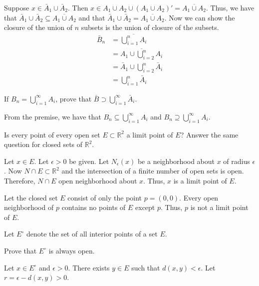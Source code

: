 \begin{exercise}
\begin{exercise}[label = (\alph*), ref = \arabic{exercisei} (\alph*)]
    Suppose \(x\in\bar{A}_1\cup \bar{A}_2\).
    Then \(x\in A_1\cup A_2\cup (A_1\cup A_2)' = \overline{A_1\cup A_2}\).
    Thus, we have that
    \(\bar{A}_1\cup \bar{A}_2\subseteq\overline{A_1\cup A_2}\) and that
    \(\bar{A}_1\cup \bar{A}_2 = \overline{A_1\cup A_2}\).
    Now we can show the closure of the union of \(n\) subsets is the union of
    closure of the subsets.
    \begin{align*}
      \bar{B}_n & = \overline{\bigcup_{i = 1}^nA_i}\\
                & = \overline{A_1\cup\bigcup_{i = 2}^nA_i}\\
                & = \bar{A}_1\cup\bigcup_{i = 2}^n\bar{A}_i\\
                & = \bigcup_{i = 1}^n\bar{A}_i
    \end{align*}
  \item
    If \(B_n = \bigcup_{i = 1}^{\infty}A_i\), prove that
    \(\bar{B}\supset\bigcup_{i = 1}^{\infty}\bar{A}_i\).
    \par\smallskip
    From the premise, we have that \(B_n\subseteq\bigcup_{i = 1}^{\infty}A_i\)
    and \(B_n\supseteq\bigcup_{i = 1}^{\infty}A_i\).
  \end{exercise}
\item
  Is every point of every open set \(E\subset\mathbb{R}^2\) a limit point of
  \(E\)?
  Answer the same question for closed sets of \(\mathbb{R}^2\).
  \par\smallskip
  Let \(x\in E\).
  Let \(\epsilon > 0\) be given.
  Let \(N_{\epsilon}(x)\) be a neighborhood about \(x\) of radius \(\epsilon\).
  Now \(N\cap E\subset\mathbb{R}^2\) and the intersection of a finite number of
  open sets is open.
  Therefore, \(N\cap E\) open neighborhood about \(x\).
  Thus, \(x\) is a limit point of \(E\).
  \par\smallskip
  Let the closed set \(E\) consist of only the point \(p = (0, 0)\).
  Every open neighborhood of \(p\) contains no points of \(E\) except \(p\).
  Thus, \(p\) is not a limit point of \(E\).
\item
  Let \(E^{\circ}\) denote the set of all interior points of a set \(E\).
  \begin{exercise}[label = (\alph*), ref = \arabic{exercisei}(\alph*)]
  \item
    Prove that \(E^{\circ}\) is always open.
    \par\smallskip
    Let \(x\in E^{\circ}\) and \(\epsilon > 0\).
    There exists \(y\in E\) such that \(d(x,y) < \epsilon\).
    Let \(r = \epsilon - d(x,y) > 0\).

\end{exercise}
\end{exercise}
